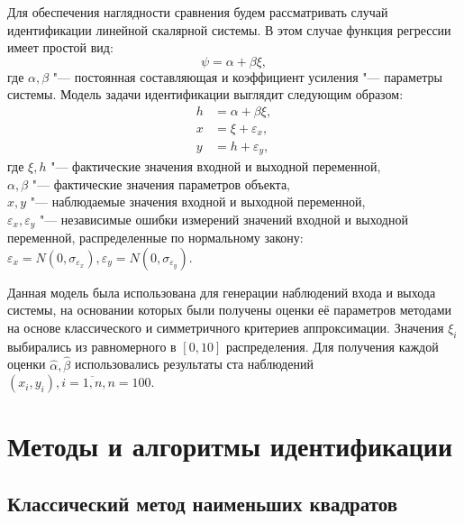 Для обеспечения наглядности сравнения будем рассматривать случай
идентификации линейной скалярной системы.
В этом случае функция регрессии имеет простой вид:
\begin{equation}
  \psi = \alpha + \beta \xi,
  \label{eq:linear_fun_scalar}
\end{equation}
где \( \alpha, \beta \) "--- постоянная составляющая и коэффициент усиления "---
параметры системы. Модель задачи идентификации выглядит следующим образом:
\begin{equation}
  \label{eq:linear_model_scalar}
  \begin{aligned}
  h &= \alpha + \beta \xi, \\
  x &= \xi + \varepsilon_x, \\
  y &= h + \varepsilon_y,
  \end{aligned}
\end{equation}
где \( \xi, h \) "--- фактические значения входной и выходной переменной, \\
\hspace*{6mm} \( \alpha, \beta \) "--- фактические значения параметров объекта, \\
\hspace*{6mm} \( x, y \) "--- наблюдаемые значения входной и выходной переменной, \\
\hspace*{5mm} \( \varepsilon_x, \varepsilon_y \) "--- независимые ошибки измерений значений
входной и выходной переменной, распределенные по нормальному закону:
\(
\varepsilon_x = N(0, \sigma_{\varepsilon_x}),
\varepsilon_y = N(0, \sigma_{\varepsilon_y})
\).

Данная модель была использована для генерации наблюдений входа и выхода системы,
на основании которых были получены оценки её параметров методами на основе
классического и симметричного критериев аппроксимации.
Значения \( \xi_i \) выбирались из равномерного в \( [0, 10] \) распределения.
Для получения каждой оценки \( \hat{\alpha}, \hat{\beta} \) использовались результаты
ста наблюдений \( ( x_i, y_i ), i = \overline{1, n}, n = 100 \).

\section{Методы и алгоритмы идентификации}

\subsection{Классический метод наименьших квадратов}

